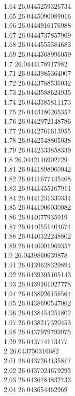 {1.64	26.0445259326734\\
1.65	26.0445090089016\\
1.66	26.0444916176988\\
1.67	26.0444737857969\\
1.68	26.0444555384683\\
1.69	26.0444368996059\\
1.7	26.0444178917982\\
1.71	26.0443985364007\\
1.72	26.0443788536032\\
1.73	26.0443588624935\\
1.74	26.0443385811173\\
1.75	26.0443180265357\\
1.76	26.0442972148786\\
1.77	26.0442761613955\\
1.78	26.0442548805038\\
1.79	26.0442333858339\\
1.8	26.0442116902729\\
1.81	26.0441898060042\\
1.82	26.0441677445468\\
1.83	26.0441455167911\\
1.84	26.0441231330334\\
1.85	26.0441006030082\\
1.86	26.044077935919\\
1.87	26.0440551404674\\
1.88	26.0440322248802\\
1.89	26.0440091969357\\
1.9	26.0439860639878\\
1.91	26.0439628329894\\
1.92	26.0439395105143\\
1.93	26.0439161027778\\
1.94	26.0438926156564\\
1.95	26.0438690547062\\
1.96	26.0438454251802\\
1.97	26.0438217320453\\
1.98	26.0437979799975\\
1.99	26.043774173477\\
2	26.043750316682\\
2.01	26.0437264135817\\
2.02	26.0437024679293\\
2.03	26.0436784832733\\
2.04	26.043654462969\\
}
